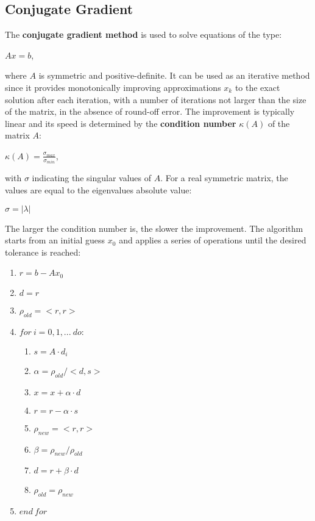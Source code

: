 \documentclass{article}
\begin{document}
\subsection{Conjugate Gradient}
The \textbf{conjugate gradient method} is used to solve equations of the type:
\begin{center}
    $Ax = b$,
\end{center}
where $A$ is symmetric and positive-definite. It can be used as an iterative method since it provides monotonically improving approximations $x_k$ to the exact solution after each iteration, with a number of iterations not larger than the size of the matrix, in the absence of round-off error. The improvement is typically linear and its speed is determined by the \textbf{condition number} $\kappa(A)$ of the matrix $A$: 
\begin{center}
    $\kappa(A) = \displaystyle\frac{\sigma_{max}}{\sigma_{min}}$,
\end{center}
with $\sigma$ indicating the singular values of $A$. For a real symmetric matrix, the values are equal to the eigenvalues absolute value:
\begin{center}
    $\sigma = |\lambda|$ \\
\end{center}
The larger the condition number is, the slower the improvement.
\newpage
The algorithm starts from an initial guess $x_0$ and applies a series of operations until the desired tolerance is reached:
\begin{enumerate}
    \item $r = b - Ax_0$
    \item $d = r$
    \item $\rho_{old} = <r,r>$
    \item $for \ i = 0,1,... \ do:$
    \begin{enumerate}[label=\arabic*.]
        \item $ s = A \cdot d_i$
        \item $\alpha = \rho_{old} / <d,s>$
        \item $x = x + \alpha \cdot d$
        \item $r = r - \alpha \cdot s$
        \item $\rho_{new} = <r,r>$
        \item $\beta = \rho_{new} / \rho_{old}$
        \item $d = r + \beta \cdot d$
        \item $\rho_{old} = \rho_{new}$
    \end{enumerate} 
    \item $end \ for$
\end{enumerate}
\end{document}
